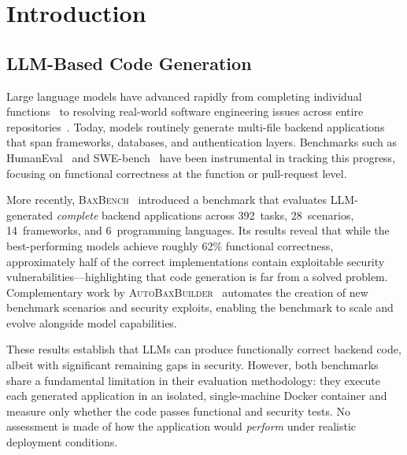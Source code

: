 
\chapter{Introduction}
\label{ch:introduction}

\section{LLM-Based Code Generation}
\label{sec:intro-context}

Large language models have advanced rapidly from completing individual
functions~\cite{chen2021humaneval} to resolving real-world software engineering
issues across entire repositories~\cite{jimenez2024swebench}.  Today, models
routinely generate multi-file backend applications that span frameworks,
databases, and authentication layers.  Benchmarks such as
HumanEval~\cite{chen2021humaneval} and SWE-bench~\cite{jimenez2024swebench}
have been instrumental in tracking this progress, focusing on functional
correctness at the function or pull-request level.

More recently, \textsc{BaxBench}~\cite{vero2025baxbench} introduced a
benchmark that evaluates LLM-generated \emph{complete} backend applications
across 392~tasks, 28~scenarios, 14~frameworks, and 6~programming languages.
Its results reveal that while the best-performing models achieve roughly 62\%
functional correctness, approximately half of the correct implementations
contain exploitable security vulnerabilities---highlighting that code
generation is far from a solved problem.  Complementary work by
\textsc{AutoBaxBuilder}~\cite{vonarx2025autobaxbuilder} automates the creation
of new benchmark scenarios and security exploits, enabling the benchmark to
scale and evolve alongside model capabilities.

These results establish that LLMs can produce functionally correct backend
code, albeit with significant remaining gaps in security.  However, both
benchmarks share a fundamental limitation in their evaluation methodology: they
execute each generated application in an isolated, single-machine Docker
container and measure only whether the code passes functional and security
tests.  No assessment is made of how the application would \emph{perform}
under realistic deployment conditions.



